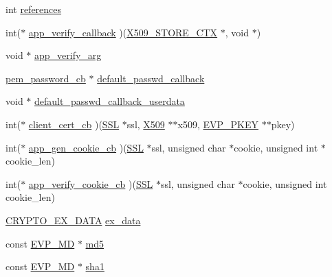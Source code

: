 \begin{DoxyCompactItemize}
\begin{tabbing}
\end{tabbing}\item 
int \hyperlink{structssl__ctx__st_aaefa58bdf5771d0ae34e05dbc372f6c3}{references}
\item 
int($\ast$ \hyperlink{structssl__ctx__st_a15acd6b0d3d6e8307c6c67e7d46c9e96}{app\+\_\+verify\+\_\+callback} )(\hyperlink{ossl__typ_8h_ae681945a2cf88d6337137dc0260a1545}{X509\+\_\+\+S\+T\+O\+R\+E\+\_\+\+C\+TX} $\ast$, void $\ast$)
\item 
void $\ast$ \hyperlink{structssl__ctx__st_ac65736129c311f93009b7f3d67b95bcf}{app\+\_\+verify\+\_\+arg}
\item 
\hyperlink{pem_8h_a3d060f1c7cb9a37a92edf7ad3b7c4fa9}{pem\+\_\+password\+\_\+cb} $\ast$ \hyperlink{structssl__ctx__st_a8065ec3c28e4a61ff8041119cc029aa2}{default\+\_\+passwd\+\_\+callback}
\item 
void $\ast$ \hyperlink{structssl__ctx__st_a66ba3cb88f01250883fd336791b354b2}{default\+\_\+passwd\+\_\+callback\+\_\+userdata}
\item 
int($\ast$ \hyperlink{structssl__ctx__st_a8e17061307de6d07b35e2563ef8ce550}{client\+\_\+cert\+\_\+cb} )(\hyperlink{ossl__typ_8h_a71f21e09bf365489dab9d85bd4785e24}{S\+SL} $\ast$ssl, \hyperlink{ossl__typ_8h_a4f666bde6518f95deb3050c54b408416}{X509} $\ast$$\ast$x509, \hyperlink{ossl__typ_8h_a2fca4fef9e4c7a2a739b1ea04acb56ce}{E\+V\+P\+\_\+\+P\+K\+EY} $\ast$$\ast$pkey)
\item 
int($\ast$ \hyperlink{structssl__ctx__st_ab2351134c9d3a5f42c85d731edfa4c1b}{app\+\_\+gen\+\_\+cookie\+\_\+cb} )(\hyperlink{ossl__typ_8h_a71f21e09bf365489dab9d85bd4785e24}{S\+SL} $\ast$ssl, unsigned char $\ast$cookie, unsigned int $\ast$cookie\+\_\+len)
\item 
int($\ast$ \hyperlink{structssl__ctx__st_ae4800a3da47080713f12d4d1ca51be16}{app\+\_\+verify\+\_\+cookie\+\_\+cb} )(\hyperlink{ossl__typ_8h_a71f21e09bf365489dab9d85bd4785e24}{S\+SL} $\ast$ssl, unsigned char $\ast$cookie, unsigned int cookie\+\_\+len)
\item 
\hyperlink{ossl__typ_8h_a7eaff1c18057495d8af18f22d1370b51}{C\+R\+Y\+P\+T\+O\+\_\+\+E\+X\+\_\+\+D\+A\+TA} \hyperlink{structssl__ctx__st_a5deb70881c01f2e35ea2fa46c37ba21e}{ex\+\_\+data}
\item 
const \hyperlink{ossl__typ_8h_aac66cf010326fa9a927c2a34888f45d3}{E\+V\+P\+\_\+\+MD} $\ast$ \hyperlink{structssl__ctx__st_a0d2c62fc7903597eef4c4890ba327a16}{md5}
\item 
const \hyperlink{ossl__typ_8h_aac66cf010326fa9a927c2a34888f45d3}{E\+V\+P\+\_\+\+MD} $\ast$ \hyperlink{structssl__ctx__st_ae6ea4c79f3be1d3c103b290e08009204}{sha1}

\end{DoxyCompactItemize}
